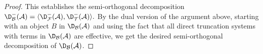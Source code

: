 \begin{proof}
This establishes the semi-orthogonal decomposition
$
\D^-_{\mathcal{B}}(\mathcal{A}) =
\langle \D^-_{\mathcal{F}}(\mathcal{A}), 
\D^-_{\mathcal{T}}(\mathcal{A})\rangle.
$
By the dual version of the argument above,
starting with an object $B$ in $\D_\mathcal{B}(\mathcal{A})$
and 
using the fact that all direct truncation systems with terms in
$\D_{\mathcal{B}}(\mathcal{A})$ are effective,
we get the desired semi-orthogonal decomposition of
$\D_\mathcal{B}(\mathcal{A})$. 
\end{proof}

